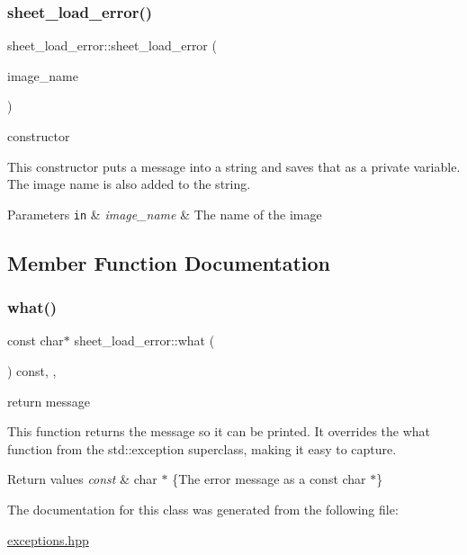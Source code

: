\subsubsection{\texorpdfstring{sheet\+\_\+load\+\_\+error()}{sheet\_load\_error()}}
{\footnotesize\ttfamily sheet\+\_\+load\+\_\+error\+::sheet\+\_\+load\+\_\+error (\begin{DoxyParamCaption}\item[{const std\+::string \&}]{image\+\_\+name }\end{DoxyParamCaption})\hspace{0.3cm}{\ttfamily [inline]}}



constructor 

This constructor puts a message into a string and saves that as a private variable. The image name is also added to the string.


\begin{DoxyParams}[1]{Parameters}
\mbox{\tt in}  & {\em image\+\_\+name} & The name of the image \\
\hline
\end{DoxyParams}


\subsection{Member Function Documentation}
\mbox{\label{classsheet__load__error_a57dd1a273a0720e58ec0eb667d0c85aa}} 
\subsubsection{\texorpdfstring{what()}{what()}}
{\footnotesize\ttfamily const char$\ast$ sheet\+\_\+load\+\_\+error\+::what (\begin{DoxyParamCaption}{ }\end{DoxyParamCaption}) const\hspace{0.3cm}{\ttfamily [inline]}, {\ttfamily [override]}, {\ttfamily [noexcept]}}



return message 

This function returns the message so it can be printed. It overrides the what function from the std\+::exception superclass, making it easy to capture.


\begin{DoxyRetVals}{Return values}
{\em const} & char $\ast$ \{The error message as a const char $\ast$\} \\
\hline
\end{DoxyRetVals}


The documentation for this class was generated from the following file\+:\begin{DoxyCompactItemize}
\item 
\hyperlink{exceptions_8hpp}{exceptions.\+hpp}\end{DoxyCompactItemize}
